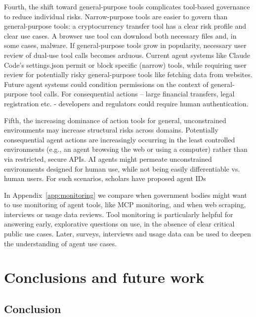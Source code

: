 \documentclass[manuscript,screen,nonacm,oneside]{acmart}
\begin{document}
Fourth, the shift toward general-purpose tools complicates tool-based governance to reduce individual risks. Narrow-purpose tools are easier to govern than general-purpose tools: a cryptocurrency transfer tool has a clear risk profile and clear use cases. A browser use tool can download both necessary files and, in some cases, malware. If general-purpose tools grow in popularity, necessary user review of dual-use tool calls becomes arduous. Current agent systems like Claude Code's settings.json permit or block specific (narrow) tools, while requiring user review for potentially risky general-purpose tools like fetching data from websites. Future agent systems could condition permissions on the context of general-purpose tool calls. For consequential actions -- large financial transfers, legal registration etc. - developers and regulators could require human authentication.

Fifth, the increasing dominance of action tools for general, unconstrained environments may increase structural risks across domains. Potentially consequential agent actions are  increasingly occurring in the least controlled environments (e.g., an agent browsing the web or using a computer) rather than via restricted, secure APIs. AI agents might permeate unconstrained environments designed for human use, while not being easily differentiable vs. human users. For such scenarios, scholars have proposed agent IDs \citep{chan2024ids}

In Appendix~\ref{app:monitoring} we compare when government bodies might want to use monitoring of agent tools, like MCP monitoring, and when web scraping, interviews or usage data reviews. Tool monitoring is particularly helpful for answering early, explorative questions on use, in the absence of clear critical public use cases. Later, surveys, interviews and usage data can be used to deepen the understanding of agent use cases. 

\section{Conclusions and future work}
\label{sec:conclusions}

\subsection{Conclusion}
\end{document}
